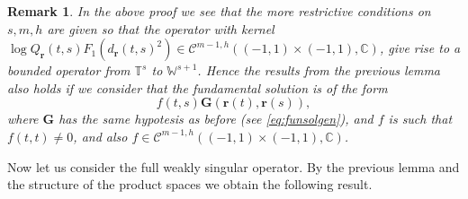 \documentclass{article}
\newtheorem{remark}[theorem]{Remark}
\newcommand{\IC}{{\mathbb C}}
\newcommand{\IT}{{\mathbb T}}
\newcommand{\IW}{{\mathbb W}}
\newcommand{\cmspaceh}[4]{\mathcal{C}^{#1,#2} \left( #3, #4 \right)}
\newcommand{\br}{\bm{r}}
\newcommand{\iinterv}{(-1,1)\times(-1,1)}
\begin{document}
\begin{remark}
\label{remark:mm1extension}
In the above proof we see that the more restrictive conditions on $s,m,h$ are given so that the operator with kernel $\log Q_{\br}(t,s) F_1(d_{\br}(t,s)^2) \in \cmspaceh{m-1}{h}{\iinterv}{\IC}$, give rise to a bounded operator from $\IT^s$ to $\IW^{s+1}$. 
Hence the results from the previous lemma also holds if we consider that the fundamental solution is of the form 
$$
f(t,s) \mathbf{G}(\br(t),\br(s)),
$$
where $\mathbf{G}$ has the same hypotesis as before (see \eqref{eq:funsolgen}), and $f$ is such that $f(t,t) \neq 0$, and also $f \in \cmspaceh{m-1}{h}{\iinterv}{\IC}$. 
\end{remark}

Now let us consider the full weakly singular operator. By the previous lemma and the structure of the product spaces we obtain the following result. 
\end{document}
